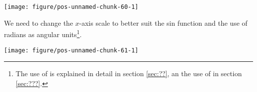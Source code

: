 \documentclass[paper=a4,headsepline,BCOR=12mm,twoside,open=right,%
titlepage,headings=small,fontsize=10pt,index=totoc,bibliography=totoc,%
captions=tableheading,captions=nooneline]{scrbook}\usepackage{knitr}
\begin{document}
\begin{knitrout}\footnotesize
{}\color{fgcolor}\begin{kframe}
\begin{alltt}
\hlstd{(}\hlstd{(}\hlstd{=}\hlstd{(}\hlstd{,}  \hlopt{*}  \hlstd{(} \hlopt{+}
  \hlstd{(}
\end{alltt}
\end{kframe}

{\centering \texttt{[image: figure/pos-unnamed-chunk-60-1]} 

}



\end{knitrout}

We need to change the $x$-axis scale to better suit the sin function and the use of radians as angular units\footnote{The use of  is explained in detail in section \ref{sec:??}, an the use of  in section \ref{sec:???}.}.

\begin{knitrout}\footnotesize
{}\color{fgcolor}\begin{kframe}
\begin{alltt}
\hlstd{(}\hlstd{(}\hlstd{=}\hlstd{(}\hlstd{,}  \hlopt{*}  \hlstd{(} \hlopt{+}
  \hlstd{(} \hlopt{+}
  \hlstd{(}
    \hlstd{=}\hlstd{(}\hlstd{,} \hlstd{,} \hlstd{,} \hlstd{,} \hlstd{)} \hlopt{*} 
    \hlstd{=}\hlstd{(}\hlstd{,} \hlstd{(}\hlopt{~} 
             \hlstd{(}\hlopt{~} \hlstd{(}\hlopt{~} \hlopt{+}
  \hlstd{(}\hlstd{=}\hlstd{)}
\end{alltt}
\end{kframe}

{\centering \texttt{[image: figure/pos-unnamed-chunk-61-1]} 

}



\end{knitrout}
\end{document}
